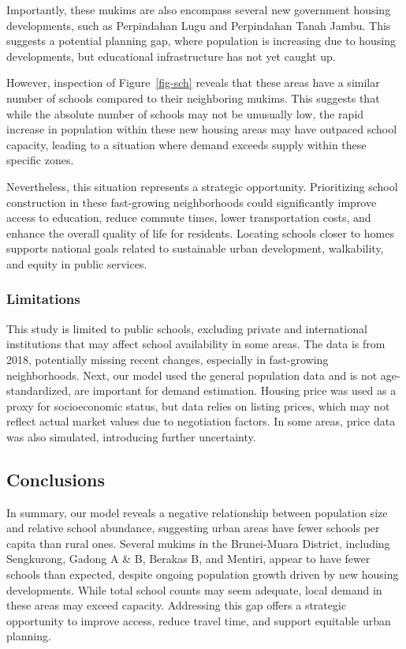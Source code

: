 \documentclass[
  12pt,
]{article}
\begin{document}
Importantly, these mukims are also encompass several new government
housing developments, such as Perpindahan Lugu and Perpindahan Tanah
Jambu. This suggests a potential planning gap, where population is
increasing due to housing developments, but educational infrastructure
has not yet caught up.

However, inspection of Figure~\ref{fig-sch} reveals that these areas
have a similar number of schools compared to their neighboring mukims.
This suggests that while the absolute number of schools may not be
unusually low, the rapid increase in population within these new housing
areas may have outpaced school capacity, leading to a situation where
demand exceeds supply within these specific zones.

Nevertheless, this situation represents a strategic opportunity.
Prioritizing school construction in these fast-growing neighborhoods
could significantly improve access to education, reduce commute times,
lower transportation costs, and enhance the overall quality of life for
residents. Locating schools closer to homes supports national goals
related to sustainable urban development, walkability, and equity in
public services.

\subsubsection{Limitations}\label{limitations}

This study is limited to public schools, excluding private and
international institutions that may affect school availability in some
areas. The data is from 2018, potentially missing recent changes,
especially in fast-growing neighborhoods. Next, our model used the
general population data and is not age-standardized, are important for
demand estimation. Housing price was used as a proxy for socioeconomic
status, but data relies on listing prices, which may not reflect actual
market values due to negotiation factors. In some areas, price data was
also simulated, introducing further uncertainty.

\subsection{Conclusions}\label{sec-conc}

In summary, our model reveals a negative relationship between population
size and relative school abundance, suggesting urban areas have fewer
schools per capita than rural ones. Several mukims in the Brunei-Muara
District, including Sengkurong, Gadong A \& B, Berakas B, and Mentiri,
appear to have fewer schools than expected, despite ongoing population
growth driven by new housing developments. While total school counts may
seem adequate, local demand in these areas may exceed capacity.
Addressing this gap offers a strategic opportunity to improve access,
reduce travel time, and support equitable urban planning.
\end{document}
